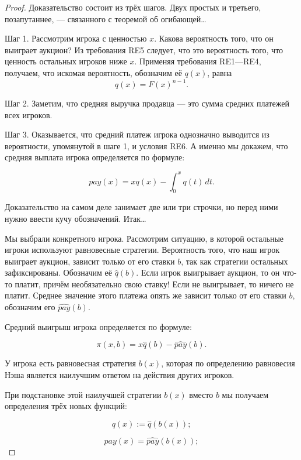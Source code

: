 \begin{proof}

Доказательство состоит из трёх шагов. Двух простых и третьего, позапутаннее, — связанного с теоремой об огибающей\ldots

Шаг 1. Рассмотрим игрока с ценностью $ x $. Какова вероятность того, что он выиграет аукцион? Из требования RE5 следует, что это вероятность того, что ценность остальных игроков ниже $ x $. Применяя требования RE1—RE4, получаем, что искомая вероятность, обозначим её $ q(x) $, равна
\[
q(x)=F(x)^{n-1}.
\]

Шаг 2. Заметим, что средняя выручка продавца — это сумма средних платежей всех игроков.


Шаг 3. Оказывается, что средний платеж игрока однозначно выводится из вероятности, упомянутой в шаге 1, и условия RE6. А именно мы докажем, что средняя выплата игрока определяется по формуле:

\begin{equation}
\label{pay_eq}
pay(x)=xq(x)-\int_{0}^{x}q(t) \, dt.
\end{equation}

Доказательство на самом деле занимает две или три строчки, но перед ними нужно ввести кучу обозначений. Итак\ldots

Мы выбрали конкретного игрока. Рассмотрим ситуацию, в которой остальные игроки используют равновесные стратегии. Вероятность того, что наш игрок выиграет аукцион, зависит только от его ставки $ b $, так как стратегии остальных за\-фик\-си\-рованы. Обозначим её $ \widehat{q}(b) $. Если игрок выигрывает аукцион, то он что-то платит, причём необязательно свою ставку! Если не выигрывает, то ничего не платит. Среднее значение этого платежа опять же зависит только от его ставки $ b $, обозначим его $ \widehat{pay}(b) $.

Средний выигрыш игрока определяется по формуле:

\begin{equation}
\pi(x,b)=x\widehat{q}(b)-\widehat{pay}(b).
\end{equation}

У игрока есть равновесная стратегия $ b(x) $, которая по определению равновесия Нэша является наилучшим ответом на действия других игроков.

При подстановке этой наилучшей стратегии  $ b(x) $ вместо $ b $ мы получаем определения трёх новых функций:

\[ q(x):=\widehat{q}(b(x)); \]

\[ pay(x)=\widehat{pay}(b(x)); \]


\end{proof}
